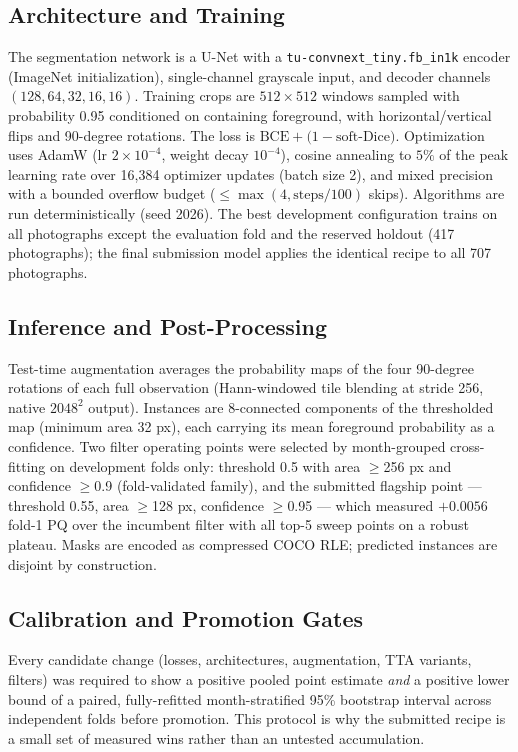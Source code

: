 \documentclass[conference]{IEEEtran}
\begin{document}
\subsection{Architecture and Training}
The segmentation network is a U-Net with a \texttt{tu-convnext\_tiny.fb\_in1k}
encoder (ImageNet initialization), single-channel grayscale input, and decoder
channels $(128,64,32,16,16)$. Training crops are $512\times512$ windows sampled with
probability 0.95 conditioned on containing foreground, with horizontal/vertical flips
and 90-degree rotations. The loss is
$\mathrm{BCE}+\bigl(1-\mathrm{soft\text{-}Dice}\bigr)$.
Optimization uses AdamW (lr $2\times10^{-4}$, weight decay $10^{-4}$), cosine
annealing to $5\%$ of the peak learning rate over 16{,}384 optimizer updates
(batch size 2), and mixed precision with a bounded overflow budget
($\le\max(4, \text{steps}/100)$ skips). Algorithms are run deterministically
(seed 2026). The best development configuration trains on all photographs except the
evaluation fold and the reserved holdout (417 photographs); the final submission model
applies the identical recipe to all 707 photographs.

\subsection{Inference and Post-Processing}
Test-time augmentation averages the probability maps of the four 90-degree rotations
of each full observation (Hann-windowed tile blending at stride 256, native
$2048^2$ output). Instances are 8-connected components of the thresholded map
(minimum area 32 px), each carrying its mean foreground probability as
a confidence. Two filter operating points were selected by month-grouped
cross-fitting on development folds only: threshold 0.5 with area $\ge$256 px and
confidence $\ge$0.9 (fold-validated family), and the submitted flagship point ---
threshold 0.55, area $\ge$128 px, confidence $\ge$0.95 --- which measured
$+0.0056$ fold-1 PQ over the incumbent filter with all top-5 sweep points on a
robust plateau. Masks are encoded as compressed COCO RLE; predicted instances
are disjoint by construction.

\subsection{Calibration and Promotion Gates}
Every candidate change (losses, architectures, augmentation, TTA variants, filters)
was required to show a positive pooled point estimate \emph{and} a positive lower
bound of a paired, fully-refitted month-stratified 95\% bootstrap interval across
independent folds before promotion. This protocol is why the submitted recipe is a
small set of measured wins rather than an untested accumulation.
\end{document}
